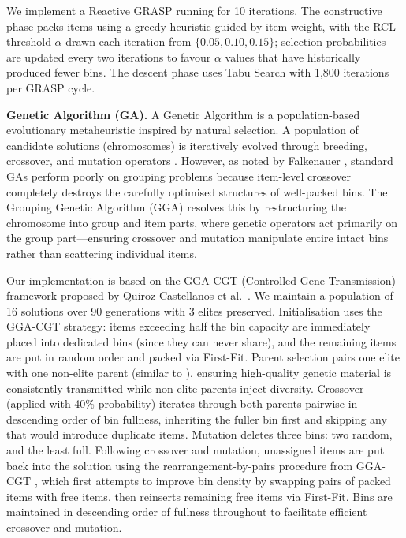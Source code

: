\documentclass[11pt]{article}
\begin{document}
We implement a Reactive GRASP running for 10 iterations. The constructive phase packs items using a greedy heuristic guided by item weight, with the RCL threshold $\alpha$ drawn each iteration from $\{0.05, 0.10, 0.15\}$; selection probabilities are updated every two iterations to favour $\alpha$ values that have historically produced fewer bins. The descent phase uses Tabu Search with 1,800 iterations per GRASP cycle.

\textbf{Genetic Algorithm (GA).} A Genetic Algorithm is a population-based evolutionary metaheuristic inspired by natural selection. A population of candidate solutions (chromosomes) is iteratively evolved through breeding, crossover, and mutation operators \cite{gendreau}. However, as noted by Falkenauer \cite{gga}, standard GAs perform poorly on grouping problems because item-level crossover completely destroys the carefully optimised structures of well-packed bins. The Grouping Genetic Algorithm (GGA) resolves this by restructuring the chromosome into group and item parts, where genetic operators act primarily on the group part---ensuring crossover and mutation manipulate entire intact bins rather than scattering individual items.

Our implementation is based on the GGA-CGT (Controlled Gene Transmission) framework proposed by Quiroz-Castellanos et al.\ \cite{quirozca}. We maintain a population of 16 solutions over 90 generations with 3 elites preserved. Initialisation uses the GGA-CGT strategy: items exceeding half the bin capacity are immediately placed into dedicated bins (since they can never share), and the remaining items are put in random order and packed via First-Fit. Parent selection pairs one elite with one non-elite parent (similar to \cite{quirozca}), ensuring high-quality genetic material is consistently transmitted while non-elite parents inject diversity. Crossover (applied with 40\% probability) iterates through both parents pairwise in descending order of bin fullness, inheriting the fuller bin first and skipping any that would introduce duplicate items. Mutation deletes three bins: two random, and the least full. Following crossover and mutation, unassigned items are put back into the solution using the rearrangement-by-pairs procedure from GGA-CGT \cite{quirozca}, which first attempts to improve bin density by swapping pairs of packed items with free items, then reinserts remaining free items via First-Fit. Bins are maintained in descending order of fullness throughout to facilitate efficient crossover and mutation.
\end{document}
